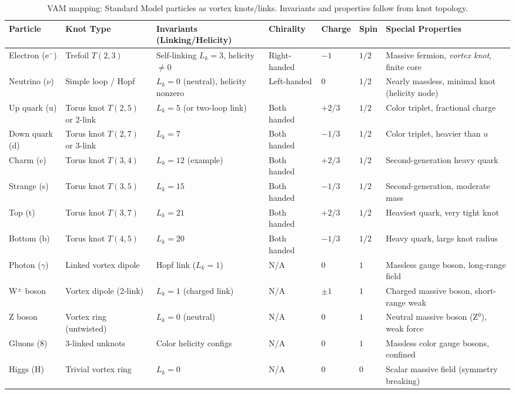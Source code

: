\documentclass[a4paper,12pt]{article}
\begin{document}
\begin{table}[H]
        \centering
        \begin{tabular}{lllllll}
            \toprule
            \textbf{Particle} & \textbf{Knot Type} & \textbf{Invariants (Linking/Helicity)} & \textbf{Chirality} & \textbf{Charge} & \textbf{Spin} & \textbf{Special Properties} \\
            \midrule
        Electron (e$^-$) & Trefoil $T(2,3)$ & Self-linking $L_k=3$, helicity $\neq 0$~\cite{vam-lagrangian} & Right-handed & $-1$ & $1/2$ & Massive fermion, \textit{vortex knot}, finite core \\
        Neutrino ($\nu$) & Simple loop / Hopf & $L_k=0$ (neutral), helicity nonzero & Left-handed & $0$ & $1/2$ & Nearly massless, minimal knot (helicity node) \\
        Up quark (u) & Torus knot $T(2,5)$ or 2-link & $L_k=5$ (or two-loop link) & Both handed & $+2/3$ & $1/2$ & Color triplet, fractional charge \\
        Down quark (d) & Torus knot $T(2,7)$ or 3-link & $L_k=7$ & Both handed & $-1/3$ & $1/2$ & Color triplet, heavier than $u$ \\
        Charm (c) & Torus knot $T(3,4)$ & $L_k=12$ (example) & Both handed & $+2/3$ & $1/2$ & Second-generation heavy quark \\
        Strange (s) & Torus knot $T(3,5)$ & $L_k=15$ & Both handed & $-1/3$ & $1/2$ & Second-generation, moderate mass \\
        Top (t) & Torus knot $T(3,7)$ & $L_k=21$ & Both handed & $+2/3$ & $1/2$ & Heaviest quark, very tight knot \\
        Bottom (b) & Torus knot $T(4,5)$ & $L_k=20$ & Both handed & $-1/3$ & $1/2$ & Heavy quark, large knot radius \\
        Photon ($\gamma$) & Linked vortex dipole & Hopf link ($L_k=1$) & N/A & $0$ & $1$ & Massless gauge boson, long-range field \\
        W$^\pm$ boson & Vortex dipole (2-link) & $L_k=1$ (charged link) & N/A & $\pm 1$ & $1$ & Charged massive boson, short-range weak \\
        Z boson & Vortex ring (untwisted) & $L_k=0$ (neutral) & N/A & $0$ & $1$ & Neutral massive boson (Z$^0$), weak force \\
        Gluons (8) & 3-linked unknots & Color helicity configs~\cite{vam-lagrangian} & N/A & $0$ & $1$ & Massless color gauge bosons, confined \\
        Higgs (H) & Trivial vortex ring & $L_k=0$ & N/A & $0$ & $0$ & Scalar massive field (symmetry breaking) \\
            \bottomrule
        \end{tabular}
    \caption{VAM mapping: Standard Model particles as vortex knots/links. Invariants and properties follow from knot topology.}
    \label{tab:topology-map}
    \end{table}
\end{document}
